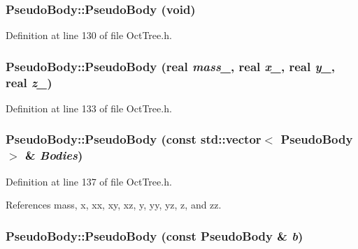 \subsubsection[{PseudoBody}]{\setlength{\rightskip}{0pt plus 5cm}PseudoBody::PseudoBody (void)}\label{classPseudoBody_afaa661d98d152810e0faeb52ac3913d6}


Definition at line 130 of file OctTree.h.

\subsubsection[{PseudoBody}]{\setlength{\rightskip}{0pt plus 5cm}PseudoBody::PseudoBody ({\bf real} {\em mass\_\-}, \/  {\bf real} {\em x\_\-}, \/  {\bf real} {\em y\_\-}, \/  {\bf real} {\em z\_\-})}\label{classPseudoBody_a0065ec4c3f863d521941255fde9b0a72}


Definition at line 133 of file OctTree.h.

\subsubsection[{PseudoBody}]{\setlength{\rightskip}{0pt plus 5cm}PseudoBody::PseudoBody (const std::vector$<$ {\bf PseudoBody} $>$ \& {\em Bodies})}\label{classPseudoBody_a5442c4ff14c3b1e3b484348add3f6567}


Definition at line 137 of file OctTree.h.



References mass, x, xx, xy, xz, y, yy, yz, z, and zz.

\subsubsection[{PseudoBody}]{\setlength{\rightskip}{0pt plus 5cm}PseudoBody::PseudoBody (const {\bf PseudoBody} \& {\em b})}\label{classPseudoBody_a938fe4b894485c490d6853329e7440bb}


